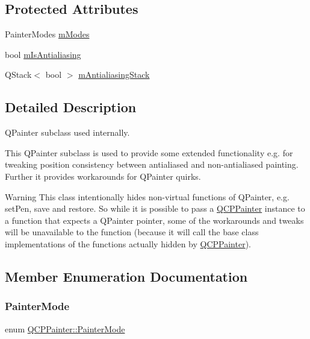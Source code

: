 \subsection*{Protected Attributes}
\begin{DoxyCompactItemize}
\item 
Painter\+Modes \mbox{\hyperlink{class_q_c_p_painter_af5d1d6e5df0adbc7de5633250fb3396c}{m\+Modes}}
\item 
bool \mbox{\hyperlink{class_q_c_p_painter_a7055085da176aee0f6b23298f1003d08}{m\+Is\+Antialiasing}}
\item 
Q\+Stack$<$ bool $>$ \mbox{\hyperlink{class_q_c_p_painter_a0189e641bbf7dc31ac15aef7b36501fa}{m\+Antialiasing\+Stack}}
\end{DoxyCompactItemize}


\subsection{Detailed Description}
Q\+Painter subclass used internally. 

This Q\+Painter subclass is used to provide some extended functionality e.\+g. for tweaking position consistency between antialiased and non-\/antialiased painting. Further it provides workarounds for Q\+Painter quirks.

\begin{DoxyWarning}{Warning}
This class intentionally hides non-\/virtual functions of Q\+Painter, e.\+g. set\+Pen, save and restore. So while it is possible to pass a \mbox{\hyperlink{class_q_c_p_painter}{Q\+C\+P\+Painter}} instance to a function that expects a Q\+Painter pointer, some of the workarounds and tweaks will be unavailable to the function (because it will call the base class implementations of the functions actually hidden by \mbox{\hyperlink{class_q_c_p_painter}{Q\+C\+P\+Painter}}). 
\end{DoxyWarning}


\subsection{Member Enumeration Documentation}
\mbox{\label{class_q_c_p_painter_a156cf16444ff5e0d81a73c615fdb156d}} 
\subsubsection{\texorpdfstring{PainterMode}{PainterMode}}
{\footnotesize\ttfamily enum \mbox{\hyperlink{class_q_c_p_painter_a156cf16444ff5e0d81a73c615fdb156d}{Q\+C\+P\+Painter\+::\+Painter\+Mode}}}

